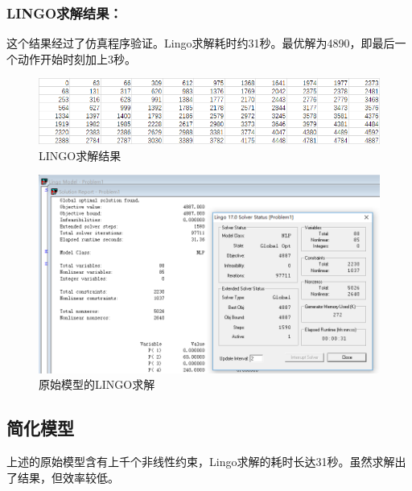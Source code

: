\documentclass{ctexart}
\begin{document}
{{{        }
    
        \subsubsection{LINGO求解结果：}
        {
    
            这个结果经过了仿真程序验证。Lingo求解耗时约31秒。最优解为4890，即最后一个动作开始时刻加上3秒。
    
            \begin{figure}[H]
                \centering
                \includegraphics[width = 0.9\linewidth]{Result1.png}
                \caption{LINGO求解结果}
            \end{figure}

            \begin{figure}[H]
                \centering
                \includegraphics[width = 1\linewidth]{prob1_raw.png}
                \caption{原始模型的LINGO求解}
            \end{figure}
    
        }
        
    }

	\subsection{简化模型}

{
	
	上述的原始模型含有上千个非线性约束，Lingo求解的耗时长达31秒。虽然求解出了结果，但效率较低。
	
}}
\end{document}
